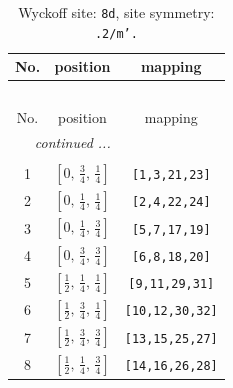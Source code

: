 \documentclass[fleqn,8pt]{jsarticle}
\begin{document}
\begin{longtable}{ccc}
\caption{Wyckoff site: {\tt 8d}, site symmetry: {\tt .2/m'.}}
 \\
 \hline \hline
No. & position & mapping \\ \hline \endfirsthead

\multicolumn{2}{l}{\tablename\ \thetable{}} \\
 \hline \hline
No. & position & mapping \\ \hline \endhead

 \hline \hline
\multicolumn{2}{r}{\footnotesize\it continued ...} \\ \endfoot

 \hline \hline
\multicolumn{2}{r}{} \\ \endlastfoot

1 & $\left[ 0,\, \frac{3}{4},\, \frac{1}{4} \right]$ & {\tt [1,3,21,23]} \\ \hline
2 & $\left[ 0,\, \frac{1}{4},\, \frac{1}{4} \right]$ & {\tt [2,4,22,24]} \\ \hline
3 & $\left[ 0,\, \frac{1}{4},\, \frac{3}{4} \right]$ & {\tt [5,7,17,19]} \\ \hline
4 & $\left[ 0,\, \frac{3}{4},\, \frac{3}{4} \right]$ & {\tt [6,8,18,20]} \\ \hline
5 & $\left[ \frac{1}{2},\, \frac{1}{4},\, \frac{1}{4} \right]$ & {\tt [9,11,29,31]} \\ \hline
6 & $\left[ \frac{1}{2},\, \frac{3}{4},\, \frac{1}{4} \right]$ & {\tt [10,12,30,32]} \\ \hline
7 & $\left[ \frac{1}{2},\, \frac{3}{4},\, \frac{3}{4} \right]$ & {\tt [13,15,25,27]} \\ \hline
8 & $\left[ \frac{1}{2},\, \frac{1}{4},\, \frac{3}{4} \right]$ & {\tt [14,16,26,28]} \\
\end{longtable}
\renewcommand{\arraystretch}{1.2}
\end{document}
